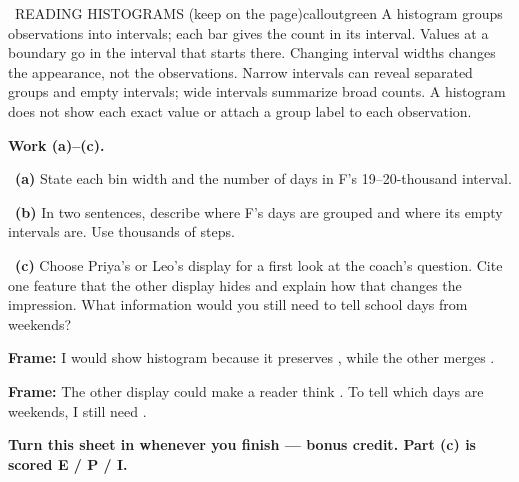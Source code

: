 \documentclass[11pt]{article}
\begin{document}
\begin{callout}{\IconBook\ READING HISTOGRAMS (keep on the page)}{calloutgreen}
A histogram groups observations into intervals; each bar gives the count in its interval. Values at a boundary go in the interval that starts there. Changing interval widths changes the appearance, not the observations. Narrow intervals can reveal separated groups and empty intervals; wide intervals summarize broad counts. A histogram does not show each exact value or attach a group label to each observation.
\end{callout}

\newpage
\textbf{Work (a)--(c).}\par\smallskip

~\textbf{(a)} State each bin width and the number of days in F's 19--20-thousand interval.\par
\workspace{0.7in}

~\textbf{(b)} In two sentences, describe where F's days are grouped and where its empty intervals are. Use thousands of steps.\par
\workspace{1.4in}

~\textbf{(c)} Choose Priya's or Leo's display for a first look at the coach's question. Cite one feature that the other display hides and explain how that changes the impression. What information would you still need to tell school days from weekends?\par
\workspace{2.0in}

\begin{sentenceframebox}\raggedright\textbf{Frame:} I would show histogram \blank[0.6in] because it preserves \blank[1.9in], while the other merges \blank[1.6in].\end{sentenceframebox}

\begin{sentenceframebox}\raggedright\textbf{Frame:} The other display could make a reader think \blank[2in]. To tell which days are weekends, I still need \blank[2in].\end{sentenceframebox}

\textbf{Turn this sheet in whenever you finish --- bonus credit. Part (c) is scored E / P / I.}\par
\end{document}
